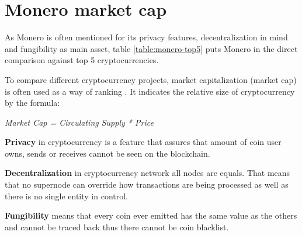\documentclass[
  printed, %
  table,   %
  nolof,     %
  nolot,     %
           oneside, color
]{fithesis3}
\begin{document}


\section{Monero market cap}
 As Monero is often mentioned for its privacy features, decentralization in mind and fungibility as main asset, table \ref{table:monero-top5} puts Monero in the direct comparison against top 5 cryptocurrencies.

To compare different cryptocurrency projects, market capitalization (market cap) is often used as a way of ranking \cite{elbahrawy2017evolutionary}. It indicates the relative size of cryptocurrency by the formula: \\ \centerline{
 \textit{\textit{Market Cap = Circulating Supply * Price} }}
 
\textbf{Privacy} in cryptocurrency is a feature that assures that amount of coin user owns, sends or receives cannot be seen on the blockchain.

\textbf{Decentralization} in cryptocurrency network all nodes are equals. That means that no supernode can override how transactions are being processed as well as there is no single entity in control.

\textbf{Fungibility} means that every coin ever emitted has the same value as the others and cannot be traced back thus there cannot be coin blacklist.
\end{document}
